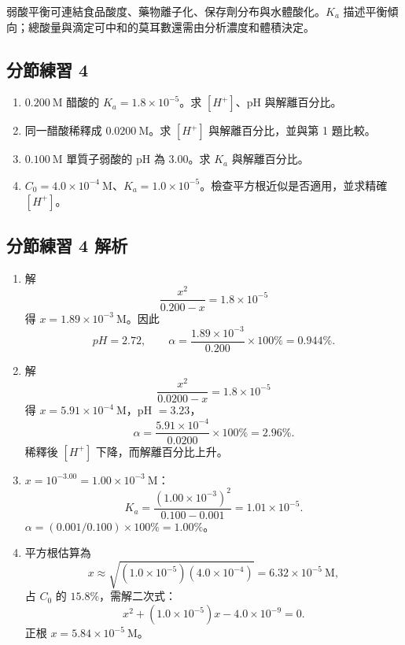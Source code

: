 \documentclass[11pt,a4paper]{article}
\providecommand{\tightlist}{%
  \setlength{\itemsep}{0pt}\setlength{\parskip}{0pt}}
\begin{document}
弱酸平衡可連結食品酸度、藥物離子化、保存劑分布與水體酸化。\(K_a\) 描述平衡傾向；總酸量與滴定可中和的莫耳數還需由分析濃度和體積決定。

\subsection{分節練習 4}\label{ux5206ux7bc0ux7df4ux7fd2-4}

\begin{enumerate}
\def\labelenumi{\arabic{enumi}.}
\tightlist
\item
  \(0.200\ \mathrm M\) 醋酸的 \(K_a=1.8\times10^{-5}\)。求 \([H^+]\)、pH 與解離百分比。
\item
  同一醋酸稀釋成 \(0.0200\ \mathrm M\)。求 \([H^+]\) 與解離百分比，並與第 1 題比較。
\item
  \(0.100\ \mathrm M\) 單質子弱酸的 pH 為 \(3.00\)。求 \(K_a\) 與解離百分比。
\item
  \(C_0=4.0\times10^{-4}\ \mathrm M\)、\(K_a=1.0\times10^{-5}\)。檢查平方根近似是否適用，並求精確 \([H^+]\)。
\end{enumerate}

\subsection{分節練習 4 解析}\label{ux5206ux7bc0ux7df4ux7fd2-4-ux89e3ux6790}

\begin{enumerate}
\def\labelenumi{\arabic{enumi}.}
\tightlist
\item
  解
  \[
  \frac{x^2}{0.200-x}=1.8\times10^{-5}
  \]
  得 \(x=1.89\times10^{-3}\ \mathrm M\)。因此
  \[
  pH=2.72,\qquad
  \alpha=\frac{1.89\times10^{-3}}{0.200}\times100\%=0.944\%.
  \]
\item
  解
  \[
  \frac{x^2}{0.0200-x}=1.8\times10^{-5}
  \]
  得 \(x=5.91\times10^{-4}\ \mathrm M\)，pH \(=3.23\)，
  \[
  \alpha=\frac{5.91\times10^{-4}}{0.0200}\times100\%=2.96\%.
  \]
  稀釋後 \([H^+]\) 下降，而解離百分比上升。
\item
  \(x=10^{-3.00}=1.00\times10^{-3}\ \mathrm M\)：
  \[
  K_a=\frac{(1.00\times10^{-3})^2}{0.100-0.001}
  =1.01\times10^{-5}.
  \]
  \(\alpha=(0.001/0.100)\times100\%=1.00\%\)。
\item
  平方根估算為
  \[
  x\approx\sqrt{(1.0\times10^{-5})(4.0\times10^{-4})}
  =6.32\times10^{-5}\ \mathrm M,
  \]
  占 \(C_0\) 的 \(15.8\%\)，需解二次式：
  \[
  x^2+(1.0\times10^{-5})x-4.0\times10^{-9}=0.
  \]
  正根 \(x=5.84\times10^{-5}\ \mathrm M\)。
\end{enumerate}
\end{document}

